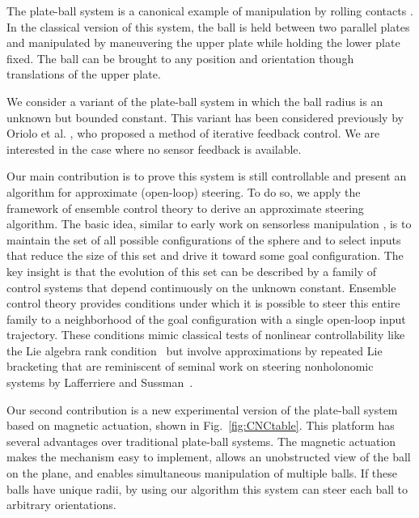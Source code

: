 \documentclass[letter paper, 10pt, conference]{ieeeconf}
\begin{document}
The plate-ball system is a canonical example of manipulation by rolling contacts \cite{Brockett1993}. In the classical version of this system, the ball is held between two parallel plates and manipulated by maneuvering the upper plate while holding the lower plate fixed.  The ball can be brought to any position and orientation though translations of the upper plate.

 We consider a variant of the plate-ball system in which the ball radius is an unknown but bounded constant. This variant has been considered previously by Oriolo et al. \cite{Oriolo2005}, who proposed a method of iterative feedback control. We are interested in the case where no sensor feedback is available.
 
 Our main contribution is to prove this system is still controllable and present an algorithm for approximate (open-loop) steering.  To do so, we apply the framework of ensemble control theory \cite{Brockett1999,Li2009,Li2011,Becker2012} to derive an approximate  %
steering algorithm. %
The basic idea, similar to early work on sensorless manipulation \cite{Erdmann1988}, is to maintain the set of all possible configurations of the sphere and to select inputs that reduce the size of this set and drive it toward some goal configuration. The key insight is that the evolution of this set can be described by a family of control systems that depend continuously on the unknown constant. Ensemble control theory provides conditions under which it is possible to steer this entire family to a neighborhood of the goal configuration with a single open-loop input trajectory. These conditions mimic classical tests of nonlinear controllability like
the Lie algebra rank condition~\cite{Sussmann1972}
but involve approximations by repeated Lie bracketing that are reminiscent of seminal work on steering nonholonomic systems by Lafferriere and Sussman~\cite{Lafferriere1993}.

Our second contribution is a new experimental version of the plate-ball system based on magnetic actuation, shown in Fig.~\ref{fig:CNCtable}.  This platform has several advantages over traditional plate-ball systems.  The magnetic actuation makes the mechanism easy to implement, allows an unobstructed view of the ball on the plane, and enables simultaneous manipulation of multiple balls.  If these balls have unique radii, by using our algorithm this system can steer each ball to arbitrary orientations.
\end{document}
